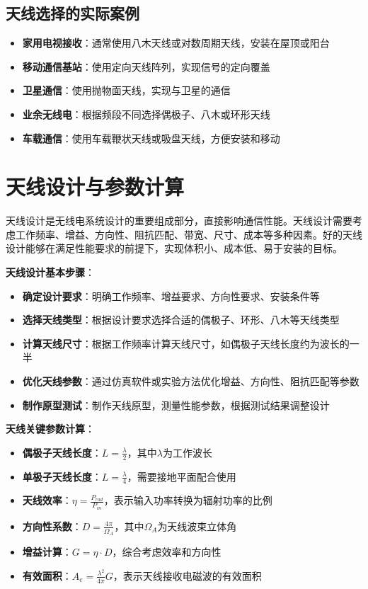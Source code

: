 \documentclass[12pt,UTF8]{ctexbook}
\begin{document}
\subsection{天线选择的实际案例}

\begin{itemize}[leftmargin=3.5em]
    \item \textbf{家用电视接收}：通常使用八木天线或对数周期天线，安装在屋顶或阳台
    \item \textbf{移动通信基站}：使用定向天线阵列，实现信号的定向覆盖
    \item \textbf{卫星通信}：使用抛物面天线，实现与卫星的通信
    \item \textbf{业余无线电}：根据频段不同选择偶极子、八木或环形天线
    \item \textbf{车载通信}：使用车载鞭状天线或吸盘天线，方便安装和移动
\end{itemize}

\section{天线设计与参数计算}

天线设计是无线电系统设计的重要组成部分，直接影响通信性能。天线设计需要考虑工作频率、增益、方向性、阻抗匹配、带宽、尺寸、成本等多种因素。好的天线设计能够在满足性能要求的前提下，实现体积小、成本低、易于安装的目标。

\textbf{天线设计基本步骤}：
\begin{itemize}[leftmargin=3.5em]
    \item \textbf{确定设计要求}：明确工作频率、增益要求、方向性要求、安装条件等
    \item \textbf{选择天线类型}：根据设计要求选择合适的偶极子、环形、八木等天线类型
    \item \textbf{计算天线尺寸}：根据工作频率计算天线尺寸，如偶极子天线长度约为波长的一半
    \item \textbf{优化天线参数}：通过仿真软件或实验方法优化增益、方向性、阻抗匹配等参数
    \item \textbf{制作原型测试}：制作天线原型，测量性能参数，根据测试结果调整设计
\end{itemize}

\textbf{天线关键参数计算}：
\begin{itemize}[leftmargin=3.5em]
    \item \textbf{偶极子天线长度}：$L = \frac{\lambda}{2}$，其中$\lambda$为工作波长
    \item \textbf{单极子天线长度}：$L = \frac{\lambda}{4}$，需要接地平面配合使用
    \item \textbf{天线效率}：$\eta = \frac{P_{rad}}{P_{in}}$，表示输入功率转换为辐射功率的比例
    \item \textbf{方向性系数}：$D = \frac{4\pi}{\Omega_A}$，其中$\Omega_A$为天线波束立体角
    \item \textbf{增益计算}：$G = \eta \cdot D$，综合考虑效率和方向性
    \item \textbf{有效面积}：$A_e = \frac{\lambda^2}{4\pi}G$，表示天线接收电磁波的有效面积
\end{itemize}
\end{document}
